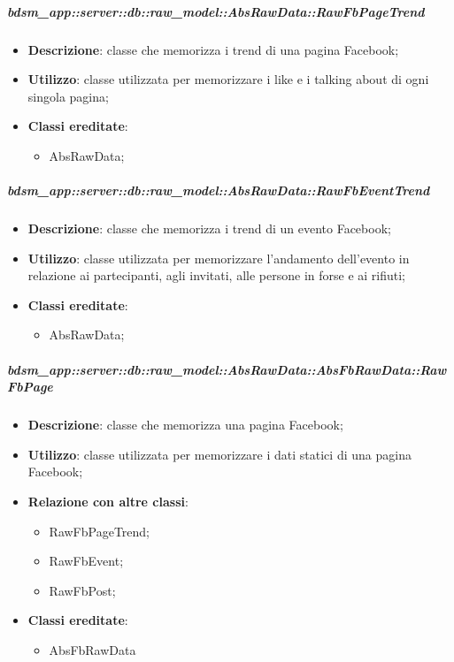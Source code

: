     \subparagraph{bdsm\_app::server::db::raw\_model::AbsRawData::RawFbPageTrend} %
    \label{subp:bdsm_app_server_raw_model_AbsRawData_RawFbPageTrend}
      \begin{itemize}
        \item \textbf{Descrizione}: classe che memorizza i trend di una pagina Facebook;
        \item \textbf{Utilizzo}: classe utilizzata per memorizzare i like e i talking about di ogni singola pagina;
        \item \textbf{Classi ereditate}:
        \begin{itemize}
          \item AbsRawData;
        \end{itemize}
      \end{itemize}
      \subparagraph{bdsm\_app::server::db::raw\_model::AbsRawData::RawFbEventTrend} %
    \label{subp:bdsm_app_server_raw_model_AbsRawData_RawFbEventTrend}
      \begin{itemize}
        \item \textbf{Descrizione}: classe che memorizza i trend di un evento Facebook;
        \item \textbf{Utilizzo}: classe utilizzata per memorizzare l'andamento dell'evento in relazione ai partecipanti, agli invitati, alle persone in forse e ai rifiuti;
        \item \textbf{Classi ereditate}:
        \begin{itemize}
          \item AbsRawData;
        \end{itemize}
      \end{itemize}
        \subparagraph{bdsm\_app::server::db::raw\_model::AbsRawData::AbsFbRawData::RawFbPage} %
    \label{subp:bdsm_app_server_raw_model_AbsRawData_AbsFbRawData_RawFbPage}
      \begin{itemize}
        \item \textbf{Descrizione}: classe che memorizza una pagina Facebook;
        \item \textbf{Utilizzo}: classe utilizzata per memorizzare i dati statici di una pagina Facebook;
        \item \textbf{Relazione con altre classi}:
        \begin{itemize}
          \item RawFbPageTrend;
          \item RawFbEvent;
          \item RawFbPost;
        \end{itemize}
        \item \textbf{Classi ereditate}:
        \begin{itemize}
          \item AbsFbRawData
        \end{itemize}
      \end{itemize}
